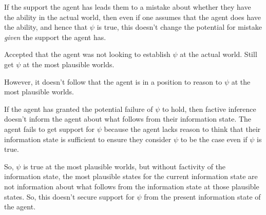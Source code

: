 \documentclass[10pt]{article}
\begin{document}
\begin{note}
  If the support the agent has leads them to a mistake about whether they have the ability in the actual world, then even if one assumes that the agent does have the ability, and hence that \(\psi\) is true, this doesn't change the potential for mistake \emph{given} the support the agent has.

  Accepted that the agent was not looking to establish \(\psi\) at the actual world.
  Still get \(\psi\) at the most plausible worlds.

  However, it doesn't follow that the agent is in a position to reason to \(\psi\) at the most plausible worlds.

  If the agent has granted the potential failure of \(\psi\) to hold, then factive inference doesn't inform the agent about what follows from their information state.
  The agent fails to get support for \(\psi\) because the agent lacks reason to think that their information state is sufficient to ensure they consider \(\psi\) to be the case even if \(\psi\) is true.

  So, \(\psi\) is true at the most plausible worlds, but without factivity of the information state, the most plausible states for the current information state are not information about what follows from the information state at those plausible states.
  So, this doesn't secure support for \(\psi\) from the present information state of the agent.
\end{note}
\end{document}
